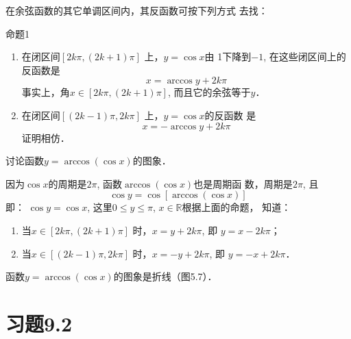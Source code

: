 在余弦函数的其它单调区间内，其反函数可按下列方式
去找：

\begin{blk}{命题1}
\begin{enumerate}
    \item 在闭区间$[2k\pi ,(2k+1)\pi]$ 上，$y=\cos x$由
    1下降到$-1$, 在这些闭区间上的反函数是
 \[   x=\arccos y+2k\pi \]
    事实上，角$x\in [2k\pi ,(2k+1)\pi]$, 而且它的余弦等于$y$．
    \item 在闭区间$[(2k-1)\pi ,2k\pi]$ 上，$y=\cos x$的反函数
    是
\[    x=-\arccos y+2k\pi \]
    证明相仿．
\end{enumerate}
\end{blk}

\begin{example}
    讨论函数$y=\arccos(\cos x)$的图象．
\end{example}

\begin{solution}
因为$\cos x$的周期是$2\pi$, 函数$\arccos(\cos x)$也是周期函
数，周期是$2\pi$, 且
\[\cos y=\cos[\arccos(\cos x)]\]
即：
$\cos y=\cos x$, 这里$0\le y\le \pi$, $x\in\mathbb{R}$根据上面的命题，
知道：
\begin{enumerate}
    \item 当$x\in[2k\pi ,(2k+1)\pi]$ 时，$x=y+2k\pi$, 即
$y=x-2k\pi$；
\item  当$x\in[(2k-1)\pi ,2k\pi]$ 时，$x=-y+2k\pi$, 即
$y=-x+2k\pi$．
\end{enumerate}
函数$y=\arccos(\cos x)$的图象是折线（图5.7）．

\begin{figure}[htp]
    \centering
{}    
    \caption{}
\end{figure}
\end{solution}


\section*{习题9.2}

